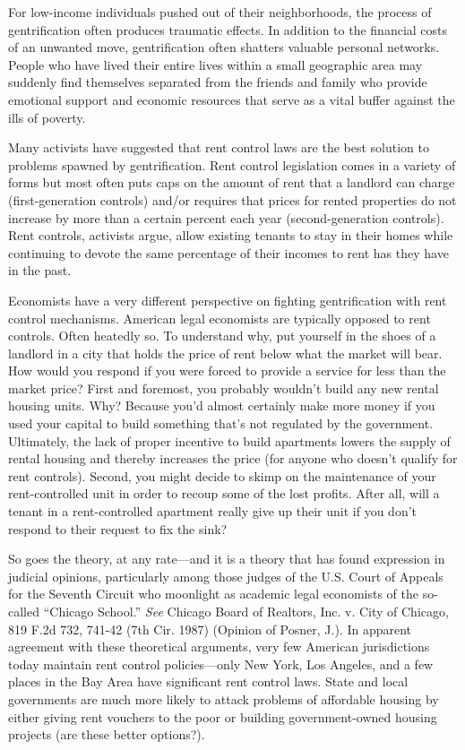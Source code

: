 For low-income individuals pushed out of their neighborhoods, the process of
gentrification often produces traumatic effects.  In addition to the financial
costs of an unwanted move, gentrification often shatters valuable personal
networks.  People who have lived their entire lives within a small geographic
area may suddenly find themselves separated from the friends and family who
provide emotional support and economic resources that serve as a vital buffer
against the ills of poverty.  

Many activists have suggested that rent control laws are the best solution to
problems spawned by gentrification.  Rent control legislation comes in a
variety of forms but most often puts caps on the amount of rent that a landlord
can charge (first-generation controls) and/or requires that prices for rented
properties do not increase by more than a certain percent each year
(second-generation controls).  Rent controls, activists argue, allow existing
tenants to stay in their homes while continuing to devote the same percentage
of their incomes to rent has they have in the past.  

Economists have a very different perspective on fighting gentrification with
rent control mechanisms. American legal economists are typically opposed to
rent controls.  Often heatedly so.  To understand why, put yourself in the
shoes of a landlord in a city that holds the price of rent below what the
market will bear.  How would you respond if you were forced to provide a
service for less than the market price?  First and foremost, you probably
wouldn't build any new rental housing units.  Why?  Because you'd almost
certainly make more money if you used your capital to build something that's
not regulated by the government.  Ultimately, the lack of proper incentive to
build apartments lowers the supply of rental housing and thereby increases the
price (for anyone who doesn't qualify for rent controls).  Second, you might
decide to skimp on the maintenance of your rent-controlled unit in order to
recoup some of the lost profits.  After all, will a tenant in a rent-controlled
apartment really give up their unit if you don't respond to their request to
fix the sink?  

So goes the theory, at any rate---and it is a theory that has found expression
in judicial opinions, particularly among those judges of the U.S. Court of
Appeals for the Seventh Circuit who moonlight as academic legal economists of
the so-called ``Chicago School.'' \textit{See }Chicago Board of Realtors, Inc.
v. City of Chicago, 819 F.2d 732, 741-42 (7th Cir. 1987) (Opinion of Posner,
J.). In apparent agreement with these theoretical arguments, very few American
jurisdictions today maintain rent control policies---only New York, Los
Angeles, and a few places in the Bay Area have significant rent control laws. 
State and local governments are much more likely to attack problems of
affordable housing by either giving rent vouchers to the poor or building
government-owned housing projects (are these better options?).  

